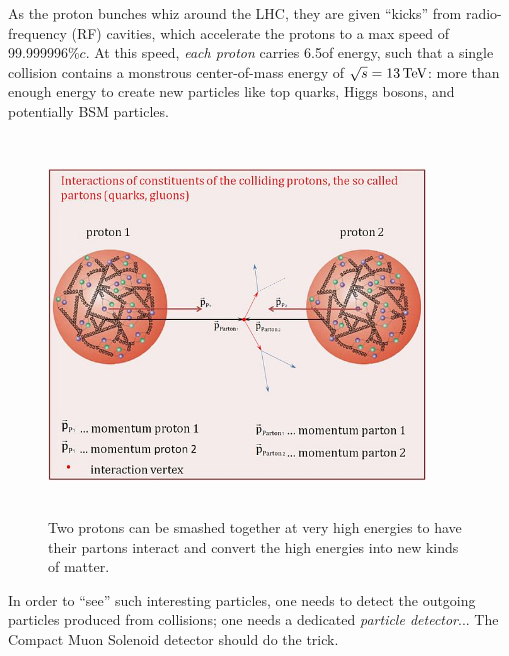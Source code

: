 As the proton bunches whiz around the LHC, they are given ``kicks'' from radio-frequency (RF) cavities, which accelerate the protons to a max speed of 99.999996\%$c$.
At this speed, \emph{each proton} carries 6.5\TeV of energy, such that a single \pp collision contains a monstrous center-of-mass energy of $\sqrt{s} = 13\,\text{Te\hspace{-.08em}V}$:
more than enough energy to create new particles like top quarks, Higgs bosons, and potentially BSM particles.
\begin{figure}[pbth]
    \centering
    \includegraphics[width=10cm,height=10cm,keepaspectratio]{figures/lhc/proton_proton_quarksandgluons.jpg}
        \caption{
        Two protons can be smashed together at very high energies to have their partons interact and convert the high energies into new kinds of matter.} 
        \label{fig:pp_collision}
    \end{figure}
In order to ``see'' such interesting particles, one needs to detect the outgoing particles produced from \pp collisions;
one needs a dedicated \emph{particle detector}...
The Compact Muon Solenoid detector should do the trick.


